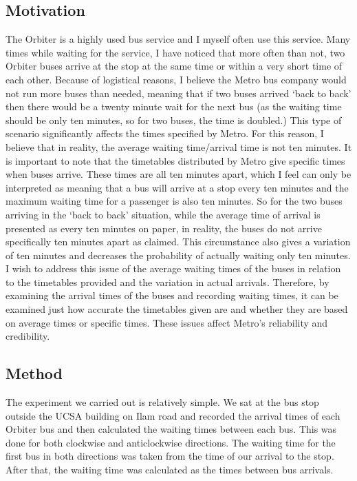 \subsection{Motivation}
The Orbiter is a highly used bus service and I myself often use this service. Many times while waiting for the service, I have noticed that more often than not, two Orbiter buses arrive at the stop at the same time or within a very short time of each other. Because of logistical reasons, I believe the Metro bus company would not run more buses than needed, meaning that if two buses arrived \textquoteleft back to back' then there would be a twenty minute wait for the next bus (as the waiting time should be only ten minutes, so for two buses, the time is doubled.) This type of scenario significantly affects the times specified by Metro. For this reason, I believe that in reality, the average waiting time/arrival time is not ten minutes. It is important to note that the timetables distributed by Metro give specific times when buses arrive. These times are all ten minutes apart, which I feel can only be interpreted as meaning that a bus will arrive at a stop every ten minutes and the maximum waiting time for a passenger is also ten minutes. So for the two buses arriving in the \textquoteleft back to back' situation, while the average time of arrival is presented as every ten minutes on paper, in reality, the buses do not arrive specifically ten minutes apart as claimed. This circumstance also gives a variation of ten minutes and decreases the probability of actually waiting only ten minutes. I wish to address this issue of the average waiting times of the buses in relation to the timetables provided and the variation in actual arrivals. Therefore, by examining the arrival times of the buses and recording waiting times, it can be examined just how accurate the timetables given are and whether they are based on average times or specific times. These issues affect Metro's reliability and credibility.

\subsection{Method}
The experiment we carried out is relatively simple. We sat at the bus stop outside the UCSA building on Ilam road and recorded the arrival times of each Orbiter bus and then calculated the waiting times between each bus. This was done for both clockwise and anticlockwise directions. The waiting time for the first bus in both directions was taken from the time of our arrival to the stop. After that, the waiting time was calculated as the times between bus arrivals.

